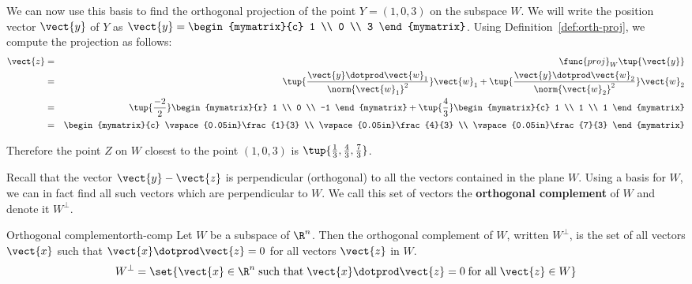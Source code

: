 \begin{solution}
We can now use this basis to find the orthogonal projection of the
point $Y=(1,0,3)$ on the subspace $W$. We will write the position
vector $\vect{y}$ of $Y$ as $\vect{y} = \begin{mymatrix}{c} 1 \\ 0 \\ 3
\end{mymatrix}$. Using Definition~\ref{def:orth-proj}, we compute the projection as follows:
\begin{eqnarray*}
\vect{z} &=& \func{proj}_{W}\tup{\vect{y}}\\
&=&
\tup{\frac{\vect{y} \dotprod \vect{w}_1}{ \norm{\vect{w}_1}^2}} \vect{w}_1
+
\tup{\frac{\vect{y} \dotprod \vect{w}_2}{ \norm{\vect{w}_2}^2}} \vect{w}_2 \\
&=&
\tup{\frac{-2}{2} } \begin{mymatrix}{r}
1 \\
0 \\
-1
\end{mymatrix}
+
\tup{\frac{4}{3} }
\begin{mymatrix}{c}
1 \\
1 \\
1 
\end{mymatrix} \\
&=& 
\begin{mymatrix}{c}
\vspace{0.05in}\frac{1}{3} \\
\vspace{0.05in}\frac{4}{3} \\
\vspace{0.05in}\frac{7}{3} 
\end{mymatrix}
\end{eqnarray*}

Therefore the point $Z$ on $W$ closest to the point $(1,0,3)$  is $\tup{\frac{1}{3}, \frac{4}{3}, \frac{7}{3} }$. 

\end{solution}

Recall that the vector $\vect{y} - \vect{z}$ is perpendicular
(orthogonal) to all the vectors contained in the plane $W$. Using a
basis for $W$, we can in fact find all such vectors which are
perpendicular to $W$. We call this set of vectors the
\textbf{orthogonal complement} of $W$ and
denote it $W^{\perp}$.

\begin{definition}{Orthogonal complement}{orth-comp}
Let $W$ be a subspace of $\R^n$. Then the orthogonal
complement of $W$, written $W^{\perp}$, is the set of all vectors
$\vect{x}$ such that $\vect{x} \dotprod \vect{z} = 0$ for all vectors
$\vect{z}$ in $W$.
\[
W^{\perp} = \set{\vect{x} \in \R^n \; \mbox{such that} \;
\vect{x} \dotprod \vect{z} = 0 \; \mbox{for all} \; \vect{z} \in W}
\]
\end{definition}

